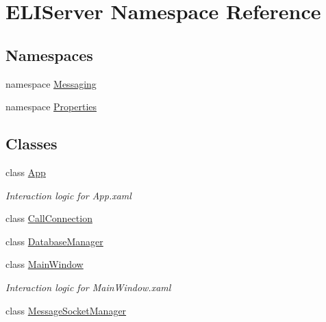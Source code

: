 \hypertarget{namespace_e_l_i_server}{}\section{E\+L\+I\+Server Namespace Reference}
\label{namespace_e_l_i_server}
\subsection*{Namespaces}
\begin{DoxyCompactItemize}
\item 
namespace \hyperlink{namespace_e_l_i_server_1_1_messaging}{Messaging}
\item 
namespace \hyperlink{namespace_e_l_i_server_1_1_properties}{Properties}
\end{DoxyCompactItemize}
\subsection*{Classes}
\begin{DoxyCompactItemize}
\item 
class \hyperlink{class_e_l_i_server_1_1_app}{App}
\begin{DoxyCompactList}\small\item\em Interaction logic for App.\+xaml \end{DoxyCompactList}\item 
class \hyperlink{class_e_l_i_server_1_1_call_connection}{Call\+Connection}
\item 
class \hyperlink{class_e_l_i_server_1_1_database_manager}{Database\+Manager}
\item 
class \hyperlink{class_e_l_i_server_1_1_main_window}{Main\+Window}
\begin{DoxyCompactList}\small\item\em Interaction logic for Main\+Window.\+xaml \end{DoxyCompactList}\item 
class \hyperlink{class_e_l_i_server_1_1_message_socket_manager}{Message\+Socket\+Manager}
\end{DoxyCompactItemize}
